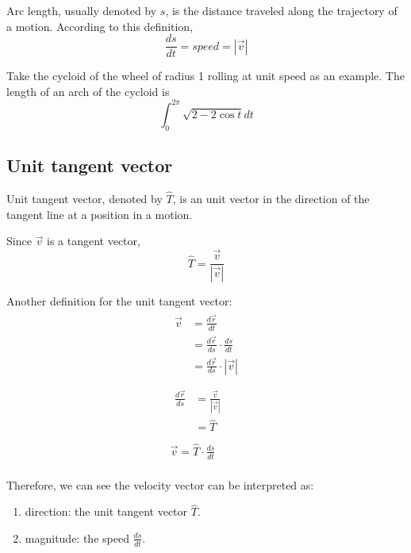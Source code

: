 \documentclass{article}
\begin{document}
Arc length, usually denoted by $s$, is the distance traveled along the 
trajectory of a motion. According to this definition,
\begin{equation*}
  \frac{ds}{dt} = speed = |\vec{v}|
\end{equation*}

Take the cycloid of the wheel of radius 1 rolling at unit speed as an example. 
The length of an arch of the cycloid is
\begin{equation*}
  \int_{0}^{2\pi} \sqrt{2 - 2\cos t} dt
\end{equation*}

\subsection{Unit tangent vector}

Unit tangent vector, denoted by $\hat{T}$, is an unit vector in the direction of 
the tangent line at a position in a motion.

Since $\vec{v}$ is a tangent vector,
\begin{equation*}
  \hat{T} = \frac{\vec{v}}{|\vec{v}|}
\end{equation*}

Another definition for the unit tangent vector:
\begin{gather*}
  \begin{split}
    \vec{v} &= \frac{d\vec{r}}{dt} \\
            &= \frac{d\vec{r}}{ds} \cdot \frac{ds}{dt} \\
            &= \frac{d\vec{r}}{ds} \cdot |\vec{v}| \\
  \end{split} \\
  \begin{split}
    \frac{d\vec{r}}{ds} &= \frac{\vec{v}}{|\vec{v}|} \\
                        &= \hat{T} \\
  \end{split} \\
  \vec{v} = \hat{T} \cdot \frac{ds}{dt} \\
\end{gather*}

Therefore, we can see the velocity vector can be interpreted as:
\begin{enumerate}
  \item direction: the unit tangent vector $\hat{T}$.
  \item magnitude: the speed $\frac{ds}{dt}$.
\end{enumerate}
\end{document}
